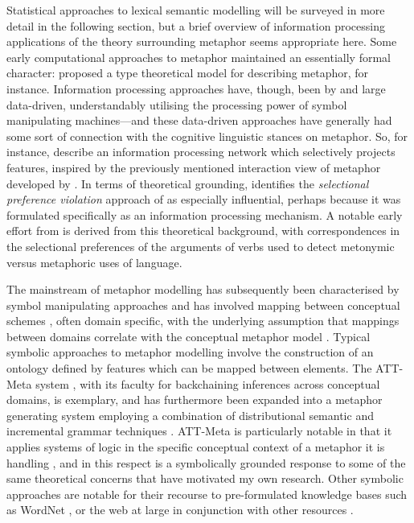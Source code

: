 Statistical approaches to lexical semantic modelling will be surveyed in more detail in the following section, but a brief overview of information processing applications of the theory surrounding metaphor seems appropriate here.  Some early computational approaches to metaphor maintained an essentially formal character: \cite{vanGenabith2001} proposed a type theoretical model for describing metaphor, for instance.  Information processing approaches have, though, been by and large data-driven, understandably utilising the processing power of symbol manipulating machines---and these data-driven approaches have generally had some sort of connection with the cognitive linguistic stances on metaphor.  So, for instance, \cite{ThomasEA1999} describe an information processing network which selectively projects features, inspired by the previously mentioned interaction view of metaphor developed by \cite{Black1977}.  In terms of theoretical grounding, \cite{Shutova2010} identifies the \emph{selectional preference violation} approach of \cite{Wilks1978} as especially influential, perhaps because it was formulated specifically as an information processing mechanism.  A notable early effort from \cite{Fass1991} is derived from this theoretical background, with correspondences in the selectional preferences of the arguments of verbs used to detect metonymic versus metaphoric uses of language.

The mainstream of metaphor modelling has subsequently been characterised by symbol manipulating approaches and has  involved mapping between conceptual schemes \citep{Indurkhya1997}, often domain specific, with the underlying assumption that mappings between domains correlate with the conceptual metaphor model \citep{Narayanan1999}.  Typical symbolic approaches to metaphor modelling involve the construction of an ontology defined by features which can be mapped between elements.  The ATT-Meta system \citep{LeeEA2001}, with its faculty for backchaining inferences across conceptual domains, is exemplary, and has furthermore been expanded into a metaphor generating system employing a combination of distributional semantic and incremental grammar techniques \citep{GargettEA2013}.  ATT-Meta is particularly notable in that it applies systems of logic in the specific conceptual context of a metaphor it is handling \citep{BarndenEA1999}, and in this respect is a symbolically grounded response to some of the same theoretical concerns that have motivated my own research.  Other symbolic approaches are notable for their recourse to pre-formulated knowledge bases such as WordNet \citep{VealeEA2015}, or the web at large in conjunction with other resources \citep{VealeEA2007}.

